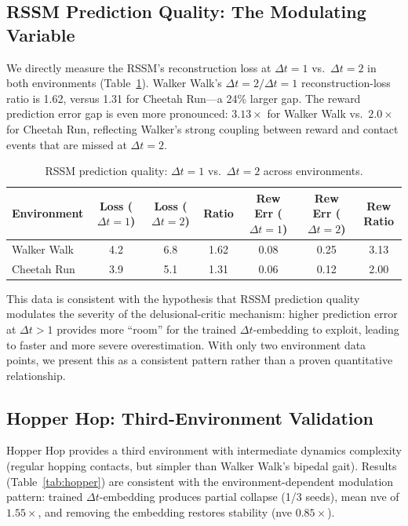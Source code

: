 \documentclass[letterpaper]{article}
\begin{document}
\subsection{RSSM Prediction Quality: The Modulating Variable}
\label{sec:rssm}

We directly measure the RSSM's reconstruction loss at $\Delta t{=}1$ vs.\ $\Delta t{=}2$ in both environments (Table~\ref{tab:rssm}).
Walker Walk's $\Delta t{=}2/\Delta t{=}1$ reconstruction-loss ratio is 1.62, versus 1.31 for Cheetah Run---a 24\% larger gap.
The reward prediction error gap is even more pronounced: $3.13\times$ for Walker Walk vs.\ $2.0\times$ for Cheetah Run, reflecting Walker's strong coupling between reward and contact events that are missed at $\Delta t{=}2$.

\begin{table}[h]
\centering
\caption{RSSM prediction quality: $\Delta t{=}1$ vs.\ $\Delta t{=}2$ across environments.}
\label{tab:rssm}
\begin{tabular}{lcccccc}
\toprule
Environment & Loss ($\Delta t{=}1$) & Loss ($\Delta t{=}2$) & Ratio & Rew Err ($\Delta t{=}1$) & Rew Err ($\Delta t{=}2$) & Rew Ratio \\
\midrule
Walker Walk & 4.2 & 6.8 & 1.62 & 0.08 & 0.25 & 3.13 \\
Cheetah Run & 3.9 & 5.1 & 1.31 & 0.06 & 0.12 & 2.00 \\
\bottomrule
\end{tabular}
\end{table}

This data is consistent with the hypothesis that RSSM prediction quality modulates the severity of the delusional-critic mechanism: higher prediction error at $\Delta t{>}1$ provides more ``room'' for the trained $\Delta t$-embedding to exploit, leading to faster and more severe overestimation.
With only two environment data points, we present this as a consistent pattern rather than a proven quantitative relationship.

\subsection{Hopper Hop: Third-Environment Validation}
\label{sec:hopper}

Hopper Hop provides a third environment with intermediate dynamics complexity (regular hopping contacts, but simpler than Walker Walk's bipedal gait).
Results (Table~\ref{tab:hopper}) are consistent with the environment-dependent modulation pattern: trained $\Delta t$-embedding produces partial collapse (1/3 seeds), mean nve of $1.55\times$, and removing the embedding restores stability (nve $0.85\times$).
\end{document}
